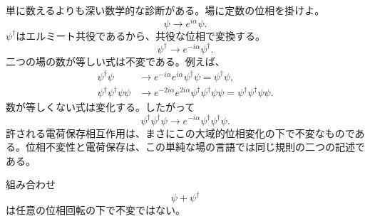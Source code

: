 \begin{classroomqa}
\end{classroomqa}

単に数えるよりも深い数学的な診断がある。場に定数の位相を掛けよ。
\begin{equation}
\psi\longrightarrow e^{i\alpha}\psi.
\end{equation}
\(\psi^\dagger\)はエルミート共役であるから、共役な位相で変換する。
\begin{equation}
\psi^\dagger\longrightarrow e^{-i\alpha}\psi^\dagger.
\end{equation}
二つの場の数が等しい式は不変である。例えば、
\begin{align}
\psi^\dagger\psi
&\longrightarrow
e^{-i\alpha}e^{i\alpha}\psi^\dagger\psi
=\psi^\dagger\psi,\\
\psi^\dagger\psi^\dagger\psi\psi
&\longrightarrow
e^{-2i\alpha}e^{2i\alpha}
\psi^\dagger\psi^\dagger\psi\psi
=\psi^\dagger\psi^\dagger\psi\psi.
\end{align}
数が等しくない式は変化する。したがって
\begin{equation}
\psi^\dagger\psi^\dagger\psi
\longrightarrow
e^{-i\alpha}\psi^\dagger\psi^\dagger\psi.
\end{equation}
許される電荷保存相互作用は、まさにこの大域的位相変化の下で不変なものである。位相不変性と電荷保存は、この単純な場の言語では同じ規則の二つの記述である。

組み合わせ
\begin{equation}
\psi+\psi^\dagger
\end{equation}
は任意の位相回転の下で不変ではない。

\begin{classroomqa}
\end{classroomqa}

\begin{classroomqa}
\end{classroomqa}

